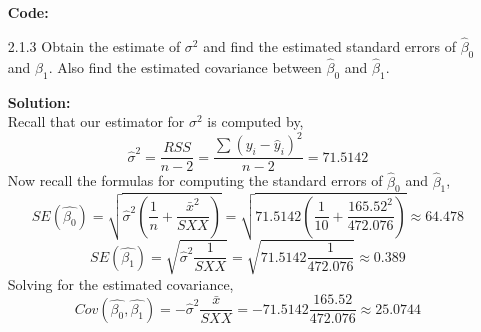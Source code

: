\documentclass[12pt]{article}
\makeatletter
\theoremstyle{homework}
\newenvironment{exercise}[1]
{\def\@currentlabel{#1}\exercisecore}
{\endexercisecore}
\newcommand{\localhead}[1]{\par\smallskip\noindent\textbf{#1}\nobreak\\}%
\newcommand\solution{\localhead{Solution:}}
\makeatother
\begin{document}
\begin{exercise}{1}
\begin{enumerate}
  \textbf{Code:}
  \begin{center}
  
  \end{center} 
  \newpage

  \item[2.1.3] Obtain the estimate of $\sigma^2$ and find the estimated standard errors of 
  $\hat{\beta}_0$ and $\hat{\beta}_1$. Also find the estimated covariance between  $\hat{\beta}_0$ and $\hat{\beta}_1$.\\ 
  \solution Recall that our estimator for $\sigma^2$ is computed by, 
  \begin{equation*}
    \hat{\sigma}^2 = \dfrac{RSS}{n - 2} = \dfrac{\sum(y_i - \hat{y}_i)^2}{n-2} = 71.5142
  \end{equation*}
  Now recall the formulas for computing the standard errors of $\hat{\beta}_0$ and $\hat{\beta}_1$, 
  \begin{equation*}
    SE(\hat{\beta_0}) = \sqrt{\hat{\sigma}^2\left(\frac{1}{n} + \frac{\bar{x}^2}{SXX}\right)} =  \sqrt{71.5142\left(\frac{1}{10} + \frac{165.52^2}{472.076}\right)} \approx 64.478
  \end{equation*}
  \begin{equation*}
    SE(\hat{\beta_1}) = \sqrt{\hat{\sigma}^2 \frac{1}{SXX}} =  \sqrt{71.5142 \frac{1}{472.076}} \approx 0.389
  \end{equation*}
  Solving for the estimated covariance, 
  \begin{equation*}
    Cov(\hat{\beta_0}, \hat{\beta_1}) = -\hat{\sigma}^2 \frac{\bar{x}}{SXX} = -71.5142 \frac{165.52}{472.076} \approx 25.0744
  \end{equation*}
   \end{enumerate}
\end{exercise}
\newpage
\end{document}
